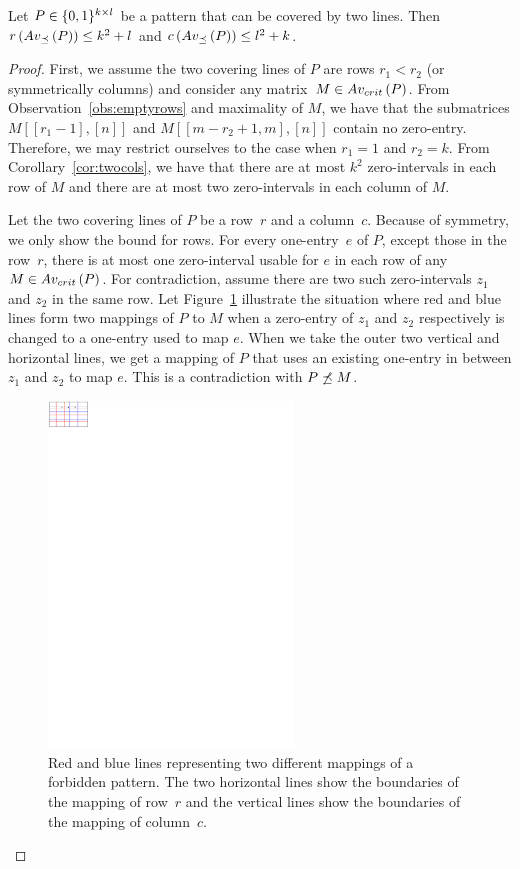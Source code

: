 \begin{lemma}
Let $P\in\{0,1\}^{k\times l}$ be a pattern that can be covered by two lines. Then $r\left(Av_{\preceq}\left(P\right)\right)\leq k^2+l$ and $c\left(Av_{\preceq}\left(P\right)\right)\leq l^2+k$.
\end{lemma}
\begin{proof}
First, we assume the two covering lines of $P$ are rows $r_1<r_2$ (or symmetrically columns) and consider any matrix~$M\in Av_{crit}\left(P\right)$. From Observation~\ref{obs:emptyrows} and maximality of $M$, we have that the submatrices $M[[r_1-1],[n]]$ and $M[[m-r_2+1,m],[n]]$ contain no zero-entry. Therefore, we may restrict ourselves to the case when $r_1=1$ and $r_2=k$. From Corollary~\ref{cor:twocols}, we have that there are at most $k^2$ zero-intervals in each row of $M$ and there are at most two zero-intervals in each column of $M$.

Let the two covering lines of $P$ be a row~$r$ and a column~$c$. Because of symmetry, we only show the bound for rows. For every one-entry~$e$ of $P$, except those in the row~$r$, there is at most one zero-interval usable for $e$ in each row of any $M\in Av_{crit}\left(P\right)$. For contradiction, assume there are two such zero-intervals $z_1$ and $z_2$ in the same row. Let Figure~\ref{fig:twolines} illustrate the situation where red and blue lines form two mappings of $P$ to $M$ when a zero-entry of $z_1$ and $z_2$ respectively is changed to a one-entry used to map $e$. When we take the outer two vertical and horizontal lines, we get a mapping of $P$ that uses an existing one-entry in between $z_1$ and $z_2$ to map $e$. This is a contradiction with $P\not\preceq M$.

\begin{figure}[!ht]
\centering
\includegraphics[width=65mm]{img/twolinescol.pdf}
\caption{Red and blue lines representing two different mappings of a forbidden pattern. The two horizontal lines show the boundaries of the mapping of row~$r$ and the vertical lines show the boundaries of the mapping of column~$c$.}
\label{fig:twolines}
\end{figure}


\end{proof}
